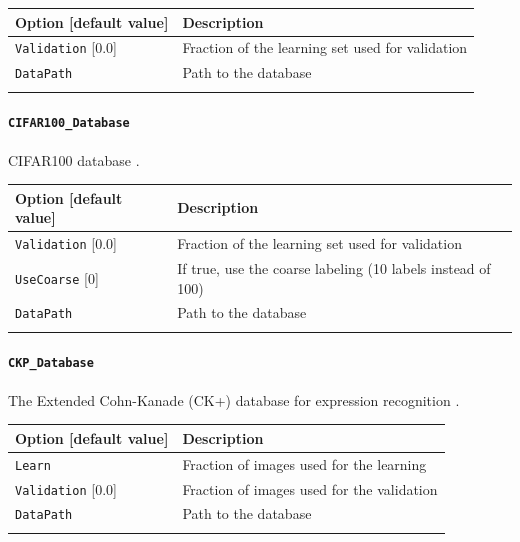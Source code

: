 \documentclass[a4paper,11pt,oneside]{article}
\begin{document}
\begin{center}
 \begin{tabular}{| p{5cm} | p{10cm} | }
 \hline
 Option [default value] & Description\\
 \hline\hline
  \lstinline!Validation! [0.0] & Fraction of the learning set used for
  validation \\
  \lstinline!DataPath! & Path to the database \\
   & \\
 \hline
\end{tabular}
\end{center}

\paragraph{\texorpdfstring{%
\lstinline[basicstyle=\ttfamily\bfseries]!CIFAR100_Database!}
{CIFAR100\_Database}}
CIFAR100 database \citep{Krizhevsky2009}.

\begin{center}
 \begin{tabular}{| p{5cm} | p{10cm} | }
 \hline
 Option [default value] & Description\\
 \hline\hline
  \lstinline!Validation! [0.0] & Fraction of the learning set used for
  validation \\
  \lstinline!UseCoarse! [0] & If true, use the coarse labeling
  (10 labels instead of 100) \\
  \lstinline!DataPath! & Path to the database \\
   \noindent [\lstinline!$N2D2_DATA!/cifar-100-binary] & \\
 \hline
\end{tabular}
\end{center}

\paragraph{\texorpdfstring{%
\lstinline[basicstyle=\ttfamily\bfseries]!CKP_Database!}{CKP\_Database}}
The Extended Cohn-Kanade (CK+) database for expression recognition
\citep{Lucey2010}.

\begin{center}
 \begin{tabular}{| p{5cm} | p{10cm} | }
 \hline
 Option [default value] & Description\\
 \hline\hline
  \lstinline!Learn! & Fraction of images used for the learning \\
  \lstinline!Validation! [0.0] & Fraction of images used for the validation \\
  \lstinline!DataPath! & Path to the database \\
   & \\
 \hline
\end{tabular}
\end{center}
\end{document}
